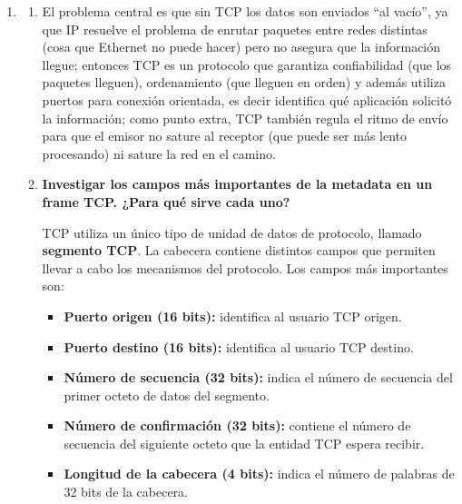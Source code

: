 \documentclass[11pt,a4paper]{article}
\begin{document}
\begin{enumerate}
\begin{enumerate}
        Las MACs se utilizan para identificar 2 dispositivos a nivel físico en una
        red que ambos dispositivos comparten una conexión. La IP identifica origen
        y destino final de las tramas. Y salvo el cambio que hace el router de la
        IP privada por la pública, se mantiene desde que sale del origen hasta que
        llega al destino.
      \item IPv4
    \end{enumerate}
  \item
    \begin{enumerate}
      \item El problema central es que sin TCP los datos son enviados ``al vacío'', ya que IP resuelve el problema de enrutar paquetes entre redes distintas (cosa que Ethernet no puede hacer) pero no asegura que la información llegue; entonces TCP es un protocolo que garantiza confiabilidad (que los paquetes lleguen), ordenamiento (que lleguen en orden) y además utiliza puertos para conexión orientada, es decir identifica qué aplicación solicitó la información; como punto extra, TCP también regula el ritmo de envío para que el emisor no sature al receptor (que puede ser más lento procesando) ni sature la red en el camino.
      \item \textbf{Investigar los campos más importantes de la metadata en un frame TCP. ¿Para qué sirve cada uno?}

TCP utiliza un único tipo de unidad de datos de protocolo, llamado \textbf{segmento TCP}. La cabecera contiene distintos campos que permiten llevar a cabo los mecanismos del protocolo. Los campos más importantes son:

\begin{itemize}
    \item \textbf{Puerto origen (16 bits):} identifica al usuario TCP origen.

    \item \textbf{Puerto destino (16 bits):} identifica al usuario TCP destino.

    \item \textbf{Número de secuencia (32 bits):} indica el número de secuencia del primer octeto de datos del segmento.

    \item \textbf{Número de confirmación (32 bits):} contiene el número de secuencia del siguiente octeto que la entidad TCP espera recibir.

    \item \textbf{Longitud de la cabecera (4 bits):} indica el número de palabras de 32 bits de la cabecera.


\end{itemize}
\end{enumerate}
\end{enumerate}
\end{document}
